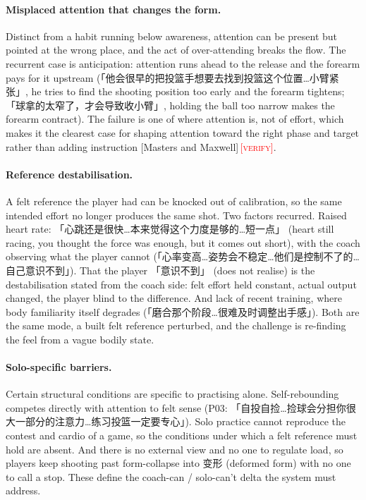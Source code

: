 \documentclass[sigconf]{acmart}
\newcommand{\vf}[1]{\textcolor{red}{[\textsc{#1}]}}
\begin{document}
\paragraph{Misplaced attention that changes the form.} Distinct from a habit running below awareness, attention can be present but pointed at the wrong place, and the act of over-attending breaks the flow. The recurrent case is anticipation: attention runs ahead to the release and the forearm pays for it upstream (「他会很早的把投篮手想要去找到投篮这个位置…小臂紧张」, he tries to find the shooting position too early and the forearm tightens; 「球拿的太窄了，才会导致收小臂」, holding the ball too narrow makes the forearm contract). The failure is one of where attention is, not of effort, which makes it the clearest case for shaping attention toward the right phase and target rather than adding instruction [Masters and Maxwell]\,\vf{verify}.

\paragraph{Reference destabilisation.} A felt reference the player had can be knocked out of calibration, so the same intended effort no longer produces the same shot. Two factors recurred. Raised heart rate: 「心跳还是很快…本来觉得这个力度是够的…短一点」 (heart still racing, you thought the force was enough, but it comes out short), with the coach observing what the player cannot (「心率变高…姿势会不稳定…他们是控制不了的…自己意识不到」). That the player 「意识不到」 (does not realise) is the destabilisation stated from the coach side: felt effort held constant, actual output changed, the player blind to the difference. And lack of recent training, where body familiarity itself degrades (「磨合那个阶段…很难及时调整出手感」). Both are the same mode, a built felt reference perturbed, and the challenge is re-finding the feel from a vague bodily state.

\paragraph{Solo-specific barriers.} Certain structural conditions are specific to practising alone. Self-rebounding competes directly with attention to felt sense (P03: 「自投自捡…捡球会分担你很大一部分的注意力…练习投篮一定要专心」). Solo practice cannot reproduce the contest and cardio of a game, so the conditions under which a felt reference must hold are absent. And there is no external view and no one to regulate load, so players keep shooting past form-collapse into 变形 (deformed form) with no one to call a stop. These define the coach-can / solo-can't delta the system must address.
\end{document}
